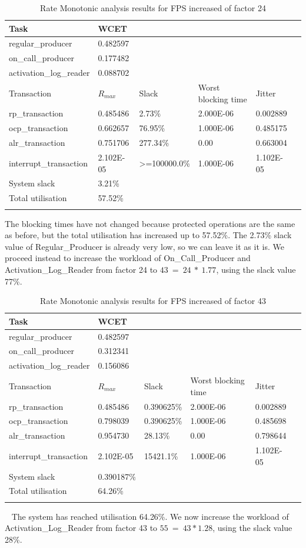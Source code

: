 \documentclass{article}
\begin{document}
\begin{longtable}{llllll}
   \toprule
   Task & WCET \\
   \midrule
   regular\_producer & 0.482597 \\
   on\_call\_producer & 0.177482 \\
   activation\_log\_reader & 0.088702 \\
   \toprule
   \toprule
   Transaction & $R_{max}$ & Slack & Worst blocking time & Jitter \\
   \midrule
   rp\_transaction & 0.485486  & 2.73\% &  2.000E-06 & 0.002889 \\
   ocp\_transaction & 0.662657 & 76.95\% & 1.000E-06 & 0.485175 \\
   alr\_transaction & 0.751706 & 277.34\% & 0.00 & 0.663004 \\
   interrupt\_transaction & 2.102E-05 & >=100000.0\% & 1.000E-06 & 1.102E-05 \\
   \toprule
   \toprule
   System slack & 3.21\% \\
   Total utilisation & 57.52\% \\
   \bottomrule
   \caption{Rate Monotonic analysis results for FPS increased of factor 24}
\label{tab:rm-fps-24}
\end{longtable}

The blocking times have not changed because protected operations are the same as before, but the total utilisation has increased up to 57.52\%. The 2.73\% slack value of Regular\_Producer is already very low, so we can leave it as it is. We proceed instead to increase the workload of On\_Call\_Producer and Activation\_Log\_Reader from factor 24 to $43\ =\ 24\ *\ 1.77$, using the slack value 77\%.

\begin{longtable}{llllll}
   \toprule
   Task & WCET \\
   \midrule
   regular\_producer & 0.482597 \\
   on\_call\_producer & 0.312341 \\
   activation\_log\_reader & 0.156086 \\
   \toprule
   \toprule
   Transaction & $R_{max}$ & Slack & Worst blocking time & Jitter \\
   \midrule
   rp\_transaction & 0.485486  & 0.390625\% &  2.000E-06 & 0.002889 \\
   ocp\_transaction & 0.798039 & 0.390625\% & 1.000E-06 & 0.485698 \\
   alr\_transaction & 0.954730 & 28.13\% & 0.00 & 0.798644 \\
   interrupt\_transaction & 2.102E-05 & 15421.1\% & 1.000E-06 & 1.102E-05 \\
   \toprule
   \toprule
   System slack & 0.390187\% \\
   Total utilisation & 64.26\% \\
   \bottomrule
   \caption{Rate Monotonic analysis results for FPS increased of factor 43}
\label{tab:rm-fps-24-ocp-44}
\end{longtable}
 
The system has reached utilisation 64.26\%. We now increase the workload of Activation\_Log\_Reader from factor 43 to $55\ =\ 43 * 1.28$, using the slack value 28\%.
\end{document}
